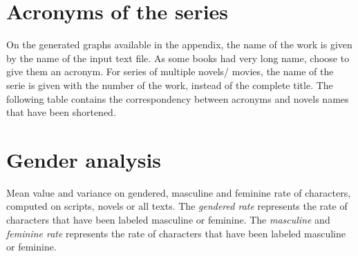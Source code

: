 \documentclass[a4paper, 12pt]{report}
\begin{document}
\listoffigures
\listoftables
 


\begin{appendices}

\chapter{Acronyms of the series}
\label{acronyms}
On the generated graphs available in the appendix, the name of the work is given by the name of the input text file. As some books had very long name, \cite{original} choose to give them an acronym. For series of multiple novels/ movies, the name of the serie is given with the number of the work, instead of the complete title. The following table contains the correspondency between acronyms and novels names that have been shortened. \\


\begin{table}
\center
{}
\caption{Acronyms of novels series.}
\label{acronyms_table}
\end{table}







\chapter{Gender analysis}
\label{gender_table}
\begin{table}[]
\caption{Mean value and variance on gendered, masculine and feminine rate of characters, computed on scripts, novels or all texts. The \textit{gendered rate} represents the  rate of characters that have been labeled masculine or feminine. The \textit{masculine} and \textit{feminine rate} represents the rate of characters that have been labeled masculine or feminine. }
 \label{gender_all}
\end{table}


\end{appendices}
\end{document}
